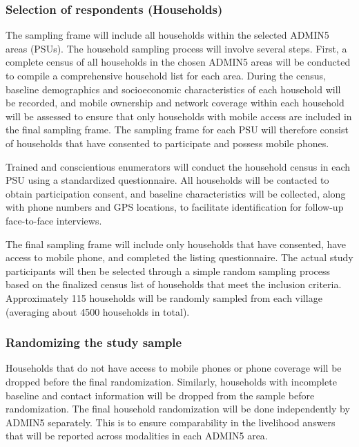 \documentclass[11pt,harvard]{article}
\begin{document}
	
	\label{tab:ADMIN5_MTN}
	
	\subsubsection{Selection of respondents (Households)}	
	The sampling frame will include all households within the selected ADMIN5 areas (PSUs). The household sampling process will involve several steps. First, a complete census of all households in the chosen ADMIN5 areas will be conducted to compile a comprehensive household list for each area. During the census, baseline demographics and socioeconomic characteristics of each household will be recorded, and mobile ownership and network coverage within each household will be assessed to ensure that only households with mobile access are included in the final sampling frame. The sampling frame for each PSU will therefore consist of households that have consented to participate and possess mobile phones.
	
	Trained and conscientious enumerators will conduct the household census in each PSU using a standardized questionnaire. All households will be contacted to obtain participation consent, and baseline characteristics will be collected, along with phone numbers and GPS locations, to facilitate identification for follow-up face-to-face interviews.
	
	The final sampling frame will include only households that have consented, have access to mobile phone, and completed the listing questionnaire. The actual study participants will then be selected through a simple random sampling process based on the finalized census list of households that meet the inclusion criteria. Approximately 115 households will be randomly sampled from each village (averaging about 4500 households in total).
	 
	\subsubsection{Randomizing the study sample}
	Households that do not have access to mobile phones or phone coverage will be dropped before the final randomization. Similarly, households with incomplete baseline and contact information will be dropped from the sample before randomization. The final household randomization will be done independently by ADMIN5 separately. This is to ensure comparability in the livelihood answers that will be reported across modalities in each ADMIN5 area.
	
\end{document}
